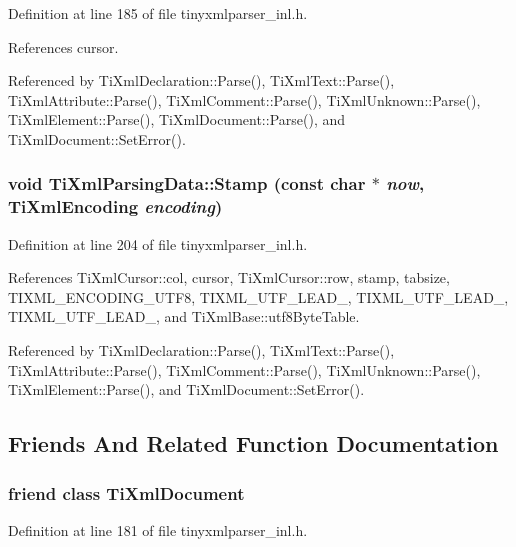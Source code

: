 Definition at line 185 of file tinyxmlparser\_\-inl.h.

References cursor.

Referenced by TiXmlDeclaration::Parse(), TiXmlText::Parse(), TiXmlAttribute::Parse(), TiXmlComment::Parse(), TiXmlUnknown::Parse(), TiXmlElement::Parse(), TiXmlDocument::Parse(), and TiXmlDocument::SetError().\hypertarget{class_ti_xml_parsing_data_a65cee8ab77a36c605db08c84b4c30a7d}{
\subsubsection[{Stamp}]{\setlength{\rightskip}{0pt plus 5cm}void TiXmlParsingData::Stamp (const char $\ast$ {\em now}, \/  {\bf TiXmlEncoding} {\em encoding})}}
\label{class_ti_xml_parsing_data_a65cee8ab77a36c605db08c84b4c30a7d}


Definition at line 204 of file tinyxmlparser\_\-inl.h.

References TiXmlCursor::col, cursor, TiXmlCursor::row, stamp, tabsize, TIXML\_\-ENCODING\_\-UTF8, TIXML\_\-UTF\_\-LEAD\_, TIXML\_\-UTF\_\-LEAD\_, TIXML\_\-UTF\_\-LEAD\_, and TiXmlBase::utf8ByteTable.

Referenced by TiXmlDeclaration::Parse(), TiXmlText::Parse(), TiXmlAttribute::Parse(), TiXmlComment::Parse(), TiXmlUnknown::Parse(), TiXmlElement::Parse(), and TiXmlDocument::SetError().

\subsection{Friends And Related Function Documentation}
\hypertarget{class_ti_xml_parsing_data_a173617f6dfe902cf484ce5552b950475}{
\subsubsection[{TiXmlDocument}]{\setlength{\rightskip}{0pt plus 5cm}friend class {\bf TiXmlDocument}}}
\label{class_ti_xml_parsing_data_a173617f6dfe902cf484ce5552b950475}


Definition at line 181 of file tinyxmlparser\_\-inl.h.

